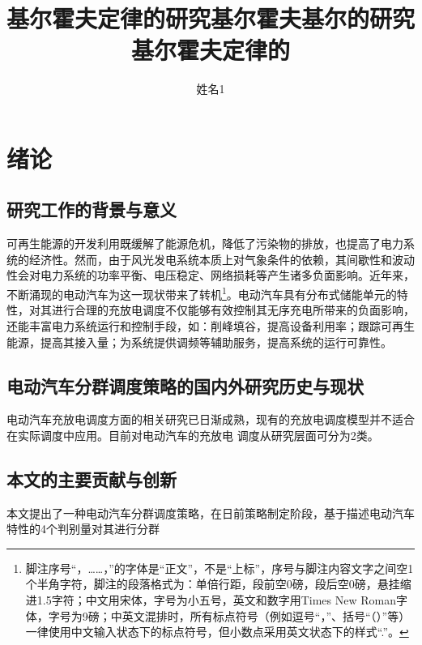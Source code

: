 \documentclass[bachelor]{NCEPU-thesis}
\title{基尔霍夫定律的研究基尔霍夫基尔的研究基尔霍夫定律的}{English Title and English Title and English Title}
\author{姓名1}{Test1}
\begin{document}
\makecoverbd





\thesistableofcontents

\chapter{绪论}
\section{研究工作的背景与意义}


可再生能源的开发利用既缓解了能源危机，降低了污染物的排放，也提高了电力系统的经济性。然而，由于风光发电系统本质上对气象条件的依赖，其间歇性和波动性会对电力系统的功率平衡、电压稳定、网络损耗等产生诸多负面影响。近年来，不断涌现的电动汽车为这一现状带来了转机\footnote{脚注序号“，……，”的字体是“正文”，不是“上标”，序号与脚注内容文字之间空1个半角字符，脚注的段落格式为：单倍行距，段前空0磅，段后空0磅，悬挂缩进1.5字符；中文用宋体，字号为小五号，英文和数字用Times New Roman字体，字号为9磅；中英文混排时，所有标点符号（例如逗号“，”、括号“（）”等）一律使用中文输入状态下的标点符号，但小数点采用英文状态下的样式“.”。}。电动汽车具有分布式储能单元的特性，对其进行合理的充放电调度不仅能够有效控制其无序充电所带来的负面影响，还能丰富电力系统运行和控制手段，如：削峰填谷，提高设备利用率；跟踪可再生能源，提高其接入量；为系统提供调频等辅助服务，提高系统的运行可靠性。

\section{电动汽车分群调度策略的国内外研究历史与现状}
电动汽车充放电调度方面的相关研究已日渐成熟，现有的充放电调度模型并不适合在实际调度中应用。目前对电动汽车的充放电
调度从研究层面可分为2类。

\section{本文的主要贡献与创新}
本文提出了一种电动汽车分群调度策略，在日前策略制定阶段，基于描述电动汽车特性的4个判别量对其进行分群
\end{document}
